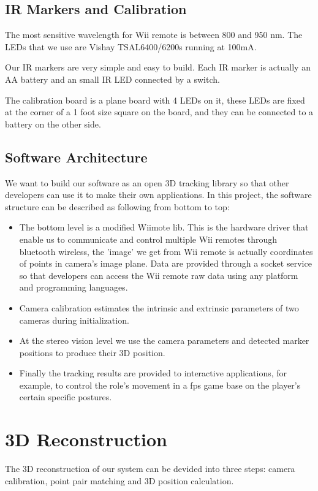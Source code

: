\documentclass[10pt,twocolumn,letterpaper]{article}
\begin{document}
\subsection{IR Markers and Calibration}
The most sensitive wavelength for Wii remote is between 800 and 950 nm.
The LEDs that we use are Vishay TSAL6400/6200s running at 100mA.

Our IR markers are very simple and easy to build. 
Each IR marker is actually an AA battery and an small IR LED
connected by a switch. 

The calibration board is a plane board 
with 4 LEDs on it, these LEDs are fixed 
at the corner of a 1 foot size square on the board, 
and they can be connected to a battery on the other side.

\subsection{Software Architecture}
We want to build our software as an open 3D tracking library so that 
other developers can use it to make their own applications. In this project, 
the software structure can be described as following from bottom to top:
\begin{itemize}
\item The bottom level is a modified Wiimote lib. This is the hardware driver that enable
us to communicate and control multiple Wii remotes through bluetooth wireless, 
the 'image' we get from Wii remote is actually coordinates of points
in camera's image plane. Data are provided through a socket service so that
developers can access the Wii remote raw data using any platform and programming languages.
\item Camera calibration estimates the intrinsic and extrinsic parameters 
of two cameras during initialization.
\item At the stereo vision level we use the camera parameters and detected marker positions
to produce their 3D position.
\item Finally the tracking results are provided to interactive applications, 
for example, to control the role's movement in a fps game base on 
the player's certain specific postures.
\end{itemize}


\section{3D Reconstruction}
The 3D reconstruction of our system can be 
devided into three steps: camera calibration, 
point pair matching and 3D position calculation. 
\end{document}

